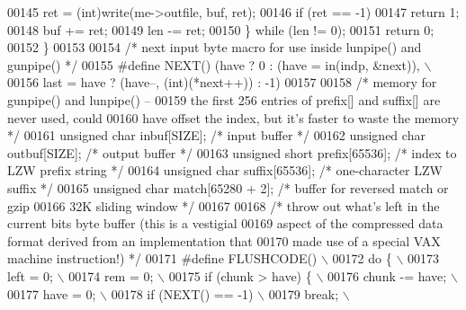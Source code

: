 \begin{DoxyCode}
00145             ret = (int)write(me->outfile, buf, ret);
00146             \textcolor{keywordflow}{if} (ret == -1)
00147                 \textcolor{keywordflow}{return} 1;
00148             buf += ret;
00149             len -= ret;
00150         \} \textcolor{keywordflow}{while} (len != 0);
00151     \textcolor{keywordflow}{return} 0;
00152 \}
00153 
00154 \textcolor{comment}{/* next input byte macro for use inside lunpipe() and gunpipe() */}
00155 \textcolor{preprocessor}{#define NEXT() (have ? 0 : (have = in(indp, &next)), \(\backslash\)}
00156 \textcolor{preprocessor}{                last = have ? (have--, (int)(*next++)) : -1)}
00157 
00158 \textcolor{comment}{/* memory for gunpipe() and lunpipe() --}
00159 \textcolor{comment}{   the first 256 entries of prefix[] and suffix[] are never used, could}
00160 \textcolor{comment}{   have offset the index, but it's faster to waste the memory */}
00161 \textcolor{keywordtype}{unsigned} \textcolor{keywordtype}{char} inbuf[SIZE];              \textcolor{comment}{/* input buffer */}
00162 \textcolor{keywordtype}{unsigned} \textcolor{keywordtype}{char} outbuf[SIZE];             \textcolor{comment}{/* output buffer */}
00163 \textcolor{keywordtype}{unsigned} \textcolor{keywordtype}{short} prefix[65536];           \textcolor{comment}{/* index to LZW prefix string */}
00164 \textcolor{keywordtype}{unsigned} \textcolor{keywordtype}{char} suffix[65536];            \textcolor{comment}{/* one-character LZW suffix */}
00165 \textcolor{keywordtype}{unsigned} \textcolor{keywordtype}{char} match[65280 + 2];         \textcolor{comment}{/* buffer for reversed match or gzip}
00166 \textcolor{comment}{                                           32K sliding window */}
00167 
00168 \textcolor{comment}{/* throw out what's left in the current bits byte buffer (this is a vestigial}
00169 \textcolor{comment}{   aspect of the compressed data format derived from an implementation that}
00170 \textcolor{comment}{   made use of a special VAX machine instruction!) */}
00171 \textcolor{preprocessor}{#define FLUSHCODE() \(\backslash\)}
00172 \textcolor{preprocessor}{    do \{ \(\backslash\)}
00173 \textcolor{preprocessor}{        left = 0; \(\backslash\)}
00174 \textcolor{preprocessor}{        rem = 0; \(\backslash\)}
00175 \textcolor{preprocessor}{        if (chunk > have) \{ \(\backslash\)}
00176 \textcolor{preprocessor}{            chunk -= have; \(\backslash\)}
00177 \textcolor{preprocessor}{            have = 0; \(\backslash\)}
00178 \textcolor{preprocessor}{            if (NEXT() == -1) \(\backslash\)}
00179 \textcolor{preprocessor}{                break; \(\backslash\)}

\end{DoxyCode}
